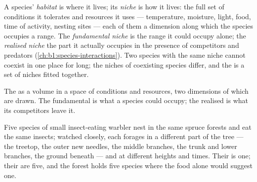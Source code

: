 \begin{definition}\label{def:b1:ecosystem-organization:niche}
A species' \emph{habitat} is where it lives; its \emph{niche} is how it
lives: the full set of conditions it tolerates and resources it uses
--- temperature, moisture, light, food, time of activity, nesting
sites --- each of them a dimension along which the species occupies
a range. The \emph{fundamental niche} is the range it could occupy
alone; the \emph{realised niche} the part it actually occupies in the
presence of competitors and predators (\cref{ch:b1:species-interactions}).
Two species with the same niche cannot coexist in one place for long;
the niches of coexisting species differ, and the  is a set
of niches fitted together.
\end{definition}

\begin{omfigure}

{\small The  as a volume in a space of conditions and resources,
two dimensions of which are drawn. The fundamental  is what a
species could occupy; the realised  is what its competitors
leave it.}
\end{omfigure}

\begin{example}\label{ex:b1:ecosystem-organization:warblers}
Five species of small insect-eating warbler nest in the same spruce
forests and eat the same insects; watched closely, each forages in a
different part of the tree --- the treetop, the outer new needles, the
middle branches, the trunk and lower branches, the ground beneath ---
and at different heights and times. Their  is one; their
 are five, and the forest holds five species where the food
alone would suggest one.
\end{example}

